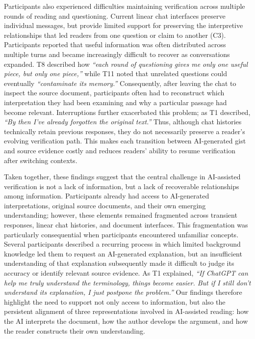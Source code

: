 \documentclass[manuscript,review,anonymous]{acmart}
\begin{document}
Participants also experienced difficulties maintaining verification across multiple rounds of reading and questioning. Current linear chat interfaces preserve individual messages, but provide limited support for preserving the interpretive relationships that led readers from one question or claim to another (C3). Participants reported that useful information was often distributed across multiple turns and became increasingly difficult to recover as conversations expanded. T8 described how \textit{``each round of questioning gives me only one useful piece, but only one piece,''} while T11 noted that unrelated questions could eventually \textit{``contaminate its memory.''} Consequently, after leaving the chat to inspect the source document, participants often had to reconstruct which interpretation they had been examining and why a particular passage had become relevant. Interruptions further exacerbated this problem; as T1 described, \textit{``By then I've already forgotten the original text.''} Thus, although chat histories technically retain previous responses, they do not necessarily preserve a reader's evolving verification path. This makes each transition between AI-generated gist and source evidence costly and reduces readers' ability to resume verification after switching contexts.

Taken together, these findings suggest that the central challenge in AI-assisted verification is not a lack of information, but a lack of recoverable relationships among information. Participants already had access to AI-generated interpretations, original source documents, and their own emerging understanding; however, these elements remained fragmented across transient responses, linear chat histories, and document interfaces. This fragmentation was particularly consequential when participants encountered unfamiliar concepts. Several participants described a recurring process in which limited background knowledge led them to request an AI-generated explanation, but an insufficient understanding of that explanation subsequently made it difficult to judge its accuracy or identify relevant source evidence. As T1 explained, \textit{``If ChatGPT can help me truly understand the terminology, things become easier. But if I still don't understand its explanation, I just postpone the problem.''} Our findings therefore highlight the need to support not only access to information, but also the persistent alignment of three representations involved in AI-assisted reading: how the AI interprets the document, how the author develops the argument, and how the reader constructs their own understanding.
\end{document}
